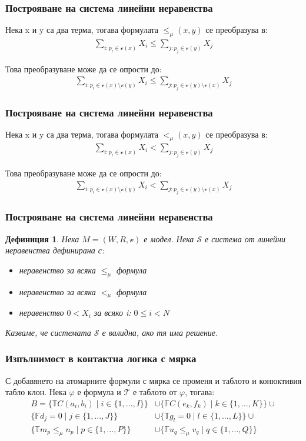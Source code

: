 \documentclass{beamer}
\newtheorem{defn}{Дефиниция}[section]
\newcommand{\vE}{\mathscr{v}}
\newcommand{\signT}{\mathbb{T}}
\newcommand{\signF}{\mathbb{F}}
\begin{document}
\begin{frame}\frametitle{Построяване на система линейни неравенства}
	Нека x и y са два терма, тогава формулата $\le_\mu(x, y)$ се преобразува в:
	\begin{align*}
		\sum_{i: p_i \in \vE(x)} X_i \leq \sum_{j: p_j \in \vE(y)} X_j
	\end{align*}

			Това преобразуване може да се опрости до:
			\begin{align*}
				\sum_{i: p_i \in \vE(x) \setminus \vE(y)} X_i \leq \sum_{j: p_j \in \vE(y) \setminus \vE(x)} X_j
			\end{align*}
\end{frame}

\begin{frame}\frametitle{Построяване на система линейни неравенства}
			Нека x и y са два терма, тогава формулата $<_\mu(x, y)$ се преобразува в:
			\begin{align*}
				\sum_{i: p_i \in \vE(x)} X_i < \sum_{j: p_j \in \vE(y)} X_j
			\end{align*}

			Това преобразуване може да се опрости до:
			\begin{align*}
				\sum_{i: p_i \in \vE(x) \setminus \vE(y)} X_i < \sum_{j: p_j \in \vE(y) \setminus \vE(x)} X_j
			\end{align*}
\end{frame}

\begin{frame}\frametitle{Построяване на система линейни неравенства}
		\begin{defn}
			Нека $M = (W, R, \vE)$ е модел. Нека $\mathscr{S}$ е система от линейни неравенства дефинирана с:
			\begin{itemize}
				\item неравенство за всяка $\le_\mu$ формула
				\item неравенство за всяка $<_\mu$ формула
				\item неравенство $0 < X_i$ за всяко i: $0 \le i < N$  
			\end{itemize}
			Казваме, че системата $\mathscr{S}$ е валидна, ако тя има решение.
		\end{defn}
\end{frame}

\begin{frame}\frametitle{Изпълнимост в контактна логика с мярка}
С добавянето на атомарните формули с мярка се променя и таблото и конюктивия табло клон.
Нека $\varphi$ е формула и $\mathcal{T}$ е таблото от $\varphi$, тогава:
		\begin{align*}
				B = \{\signT C(a_i, b_i) \mid i \in \{1, \ldots, I\} \} &\cup 
					\{\signF C(e_k, f_k) \mid k \in \{1, \ldots, K\} \} \cup \\
					\{\signF d_j = 0 \mid j \in \{1, \ldots, J\} \} &\cup 
					\{\signT g_l = 0 \mid l \in \{1, \ldots, L\} \} \cup \\
					\{\signT m_p \le_\mu n_p \mid p \in \{1, \ldots, P\} \} &\cup
					\{\signF u_q \le_\mu v_q \mid q \in \{1, \ldots, Q\} \}
		\end{align*}
\end{frame}
\end{document}

